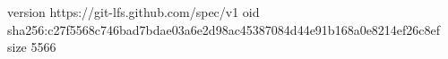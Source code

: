 version https://git-lfs.github.com/spec/v1
oid sha256:c27f5568c746bad7bdae03a6e2d98ac45387084d44e91b168a0e8214ef26c8ef
size 5566
